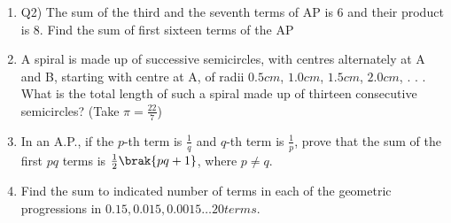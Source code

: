 \begin{enumerate}[label=\thechapter.\arabic*,ref=\thechapter.\theenumi]
\item Q2) The sum of the third and the seventh terms of AP is 6 and their product is 8. Find the sum of first sixteen terms of the AP \\
\solution
\pagebreak
\item A spiral is made up of successive semicircles, with centres alternately at A and B, starting with centre at A, of radii $0.5 cm$, $1.0 cm$, $1.5 cm$, $2.0 cm$, . . . What is the total length of such a spiral made up of thirteen consecutive semicircles? (Take $\pi = \frac{22}{7}$)\\
\solution
\newpage
\item In an A.P., if the $p$-th term is $\frac{1}{q}$ and $q$-th term is $\frac{1}{p}$, prove that the sum of the first $pq$ terms is $\frac{1}{2}\brak{pq + 1}$, where $p \neq q$.
\solution
\pagebreak

\item Find the sum to indicated number of terms in each of the geometric progressions in
$0.15, 0.015, 0.0015\ldots 20 terms$.\\
\solution

\pagebreak
\end{enumerate}
